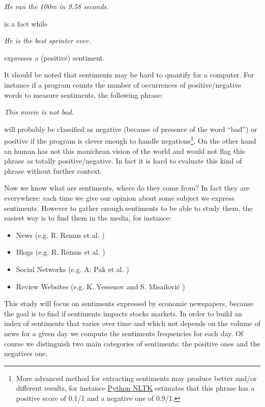 \documentclass[12pt]{report}
\begin{document}
\begin{center}
	\emph{He ran the 100m in 9.58 seconds.}
\end{center} is a fact while

\begin{center}
	\emph{He is the best sprinter ever.}
\end{center}

expresses a (positive) sentiment.

It should be noted that sentiments may be hard to quantify for a computer. For instance if a program counts the number of occurrences of positive/negative words to measure sentiments, the following phrase:

\begin{center}
	\emph{This movie is not bad.}
\end{center}

will probably be classified as negative (because of presence of the word ``bad'') or positive if the program is clever enough to handle negations\footnote{More advanced method for extracting sentiments may produce better and/or different results, for instance \href{http://text-processing.com/demo/sentiment/}{Python NLTK} estimates that this phrase has a positive score of 0.1/1 and a negative one of 0.9/1.}. On the other hand an human has not this manichean vision of the world and would not flag this phrase as totally positive/negative. In fact it is hard to evaluate this kind of phrase without further context.

Now we know what are sentiments, where do they come from? In fact they are everywhere: each time we give our opinion about some subject we express sentiments. However to gather enough sentiments to be able to study them, the easiest way is to find them in the media, for instance:
\begin{itemize}
	\item News (e.g. R. Remus et al. \cite{remus09})
	\item Blogs (e.g. R. Remus et al. \cite{remus09})
	\item Social Networks (e.g. A. Pak et al. \cite{pak10})
	\item Review Websites (e.g. K. Yessenov and S. Misailovi\'c \cite{yessenov09})
\end{itemize}

This study will focus on sentiments expressed by economic newspapers, because the goal is to find if sentiments impacts stocks markets. In order to build an index of sentiments that varies over time and which not depends on the volume of news for a given day we compute the sentiments frequencies for each day. Of course we distinguish two main categories of sentiments: the positive ones and the negatives one.
\end{document}
